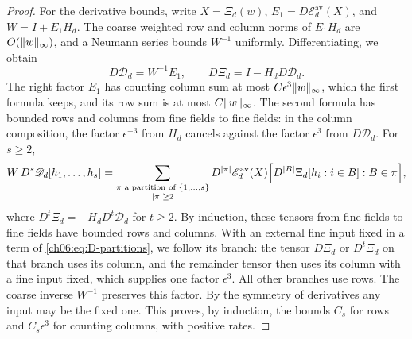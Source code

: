 \begin{proof}
For the derivative bounds, write $X=\Xi_d(w)$, $E_1=D\mathscr E_d^{\mathrm{av}}(X)$, and $W=I+E_1H_d$. The coarse weighted row and column norms of $E_1H_d$ are $O(\lVert w\rVert_\infty)$, and a Neumann series bounds $W^{-1}$ uniformly. Differentiating, we obtain
\begin{equation}\label{ch06:eq:D-prime}
 D\mathscr D_d=W^{-1}E_1,\qquad D\Xi_d=I-H_dD\mathscr D_d.
\end{equation}
The right factor $E_1$ has counting column sum at most $C\epsilon^3\lVert w\rVert_\infty$, which the first formula keeps, and its row sum is at most $C\lVert w\rVert_\infty$. The second formula has bounded rows and columns from fine fields to fine fields: in the column composition, the factor $\epsilon^{-3}$ from $H_d$ cancels against the factor $\epsilon^3$ from $D\mathscr D_d$. For $s\ge2$,
\begin{equation}\label{ch06:eq:D-partitions}
 W\,D^s\mathscr D_d[h_1,\ldots,h_s]=\sum_{\substack{\pi\text{ a partition of }\{1,\ldots,s\}\\\lvert \pi\rvert\ge2}}D^{\lvert \pi\rvert}\mathscr E_d^{\mathrm{av}}(X)\Bigl[D^{\lvert B\rvert}\Xi_d[h_i:i\in B]:B\in\pi\Bigr],
\end{equation}
where $D^t\Xi_d=-H_dD^t\mathscr D_d$ for $t\ge2$. By induction, these tensors from fine fields to fine fields have bounded rows and columns. With an external fine input fixed in a term of \eqref{ch06:eq:D-partitions}, we follow its branch: the tensor $D\Xi_d$ or $D^t\Xi_d$ on that branch uses its column, and the remainder tensor then uses its column with a fine input fixed, which supplies one factor $\epsilon^3$. All other branches use rows. The coarse inverse $W^{-1}$ preserves this factor. By the symmetry of derivatives any input may be the fixed one. This proves, by induction, the bounds $C_s$ for rows and $C_s\epsilon^3$ for counting columns, with positive rates.


\end{proof}
